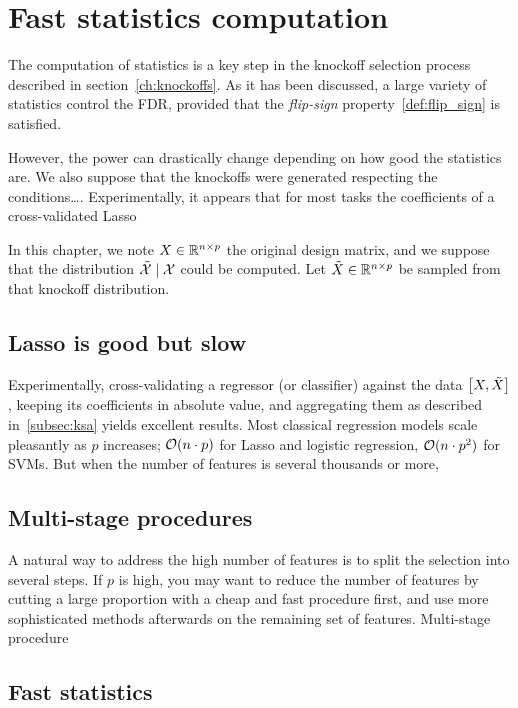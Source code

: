 \chapter{Fast statistics computation}\label{ch:fsc}

The computation of statistics is a key step in the knockoff selection process described in section~\ref{ch:knockoffs}.
As it has been discussed, a large variety of statistics control the FDR,
provided that the \textit{flip-sign} property~\ref{def:flip_sign} is satisfied.

However, the power can drastically change depending on how good the statistics are.
We also suppose that the knockoffs were generated respecting the conditions\dots.
Experimentally, it appears that for most tasks the coefficients of a cross-validated Lasso

In this chapter, we note $X \in \mathbb{R}^{n \times p}$ the original design matrix,
and we suppose that the distribution $\tilde{\mathcal{X}} \mid \mathcal{X}$ could be computed.
Let $\tilde{X} \in \mathbb{R}^{n \times p}$ be sampled from that knockoff distribution.

\section{Lasso is good but slow}\label{sec:}

Experimentally, cross-validating a regressor (or classifier) against the data $\big[ X, \tilde{X} \big]$,
keeping its coefficients in absolute value,
and aggregating them as described in~\ref{subsec:ksa} yields excellent results.
Most classical regression models scale pleasantly as $p$ increases;
$\mathcal{O}(n \cdot p)$ for Lasso and logistic regression,
$\mathcal{O}(n \cdot p^2)$ for SVMs.
But when the number of features is several thousands or more,

\section{Multi-stage procedures}\label{sec:multi_stage}

A natural way to address the high number of features is to split the selection into several steps.
If $p$ is high,
you may want to reduce the number of features by cutting a large proportion with a cheap and fast procedure first,
and use more sophisticated methods afterwards on the remaining set of features.
Multi-stage procedure~\cite{multi_stage_fdr}

\section{Fast statistics}\label{sec:a}

